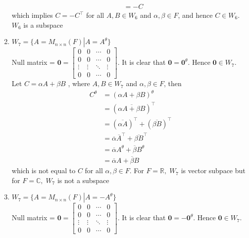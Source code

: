 \documentclass[a4paper, titlepage]{article}
\begin{document}
\begin{enumerate}[label=\textbf{\arabic*.}]
\begin{align*}
                    &= -C
    \end{align*}
    which implies $C = -C^\intercal$ for all $A, B \in W_6$ and 
    $\alpha, \beta \in F$, and hence $C \in W_6$. $W_6$ is a subspace
    \item $W_7 = \{ A = M_{n\times n}(F) \left. \right\vert 
    A = A^\theta \}$ \hfill \\
    Null matrix = $\textbf{0} =  
    \begin{bmatrix}
        0 & 0 & \cdots & 0 \\
        0 & 0 & \cdots & 0 \\
        \vdots & \vdots & \ddots & \vdots \\ 
        0 & 0 & \cdots & 0
    \end{bmatrix}$. It is clear that 
    $\textbf{0} = \textbf{0}^\theta$. Hence $\textbf{0} \in W_7$. \hfill \\
    Let 
    $C = \alpha A + \beta B$
    , where $A, B \in W_7$ and $\alpha, \beta \in F$, then 
    \begin{align*}
        C^\theta &= (\alpha A + \beta B)^\theta \\
                 &= (\overline{\alpha A + \beta B})^\top \\
                 &= (\overline{\alpha A})^\intercal + (\overline{\beta B})^\intercal \\
                 &= \overline{\alpha} \overline{A}^\intercal + \overline{\beta B}^\intercal \\
                 &= \overline{\alpha} A^\theta + \overline{\beta} B^\theta \\
                 &= \overline{\alpha} A + \overline{\beta} B
    \end{align*}
    which is not equal to $C$ for all $\alpha, \beta \in F$. 
    For $F = \mathbb{R}, \; W_7$ is vector subpace but for 
    $F = \mathbb{C}, \; W_7$ is not a subspace
    \item $W_7 = \{ A = M_{n\times n}(F) \left. \right\vert 
    A = -A^\theta \}$ \hfill \\
    Null matrix = $\textbf{0} =  
    \begin{bmatrix}
        0 & 0 & \cdots & 0 \\
        0 & 0 & \cdots & 0 \\
        \vdots & \vdots & \ddots & \vdots \\ 
        0 & 0 & \cdots & 0
    \end{bmatrix}$. It is clear that 
    $\textbf{0} = -\textbf{0}^\theta$. Hence $\textbf{0} \in W_7$. \hfill \\

\end{enumerate}
\end{document}
